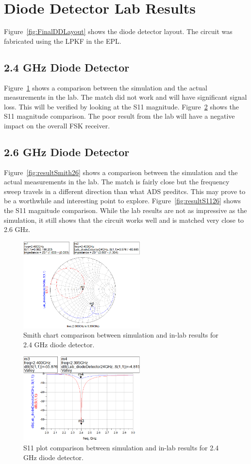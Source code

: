 \documentclass[conference]{IEEEtran}
\begin{document}
\section{Diode Detector Lab Results}
Figure~\ref{fig:FinalDDLayout} shows the diode detector layout. The circuit was fabricated using the LPKF in the EPL.
\subsection{2.4 GHz Diode Detector}
Figure~\ref{fig:resultSmith24} shows a comparison between the simulation and the actual measurements in the lab. The match did not work and will have significant signal loss. This will be verified by looking at the S11 magnitude. Figure~\ref{fig:resultS1124} shows the S11 magnitude comparison. The poor result from the lab will have a negative impact on the overall FSK receiver.
\subsection{2.6 GHz Diode Detector}
Figure~\ref{fig:resultSmith26} shows a comparison between the simulation and the actual measurements in the lab. The match is fairly close but the frequency sweep travels in a different direction than what ADS preditcs. This may prove to be a worthwhile and interesting point to explore. Figure~\ref{fig:resultS1126} shows the S11 magnitude comparison. While the lab results are not as impressive as the simulation, it still shows that the circuit works well and is matched very close to 2.6 GHz.

\begin{figure}[!htb]
\centering
\includegraphics[width=2.5in]{diode-pics/diodedetectorLab24Smith.png}
\caption{Smith chart comparison between simulation and in-lab results for 2.4 GHz diode detector.}
\label{fig:resultSmith24}
\end{figure}

\begin{figure}[!htb]
\centering
\includegraphics[width=2.5in]{diode-pics/diodedetectorLab24S11.png}
\caption{S11 plot comparison between simulation and in-lab results for 2.4 GHz diode detector.}
\label{fig:resultS1124}
\end{figure}
\end{document}
